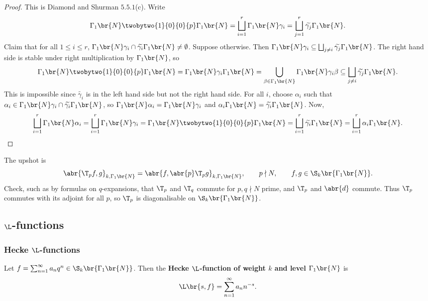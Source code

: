 \begin{proof}
This is Diamond and Shurman $ 5.5.1 $(c). Write
$$ \Gamma_1\br{N}\twobytwo{1}{0}{0}{p}\Gamma_1\br{N} = \bigsqcup_{i = 1}^r \Gamma_1\br{N}\gamma_i = \bigsqcup_{j = 1}^r \widetilde{\gamma_j}\Gamma_1\br{N}. $$
Claim that for all $ 1 \le i \le r $, $ \Gamma_1\br{N}\gamma_i \cap \widetilde{\gamma_i}\Gamma_1\br{N} \ne \emptyset $. Suppose otherwise. Then $ \Gamma_1\br{N}\gamma_i \subseteq \bigsqcup_{j \ne i} \widetilde{\gamma_j}\Gamma_1\br{N} $. The right hand side is stable under right multiplication by $ \Gamma_1\br{N} $, so
$$ \Gamma_1\br{N}\twobytwo{1}{0}{0}{p}\Gamma_1\br{N} = \Gamma_1\br{N}\gamma_i\Gamma_1\br{N} = \bigcup_{\beta \in \Gamma_1\br{N}} \Gamma_1\br{N}\gamma_i\beta \subseteq \bigsqcup_{j \ne i} \widetilde{\gamma_j}\Gamma_1\br{N}. $$
This is impossible since $ \widetilde{\gamma_i} $ is in the left hand side but not the right hand side. For all $ i $, choose $ \alpha_i $ such that $ \alpha_i \in \Gamma_1\br{N}\gamma_i \cap \widetilde{\gamma_i}\Gamma_1\br{N} $, so $ \Gamma_1\br{N}\alpha_i = \Gamma_1\br{N}\gamma_i $ and $ \alpha_i\Gamma_1\br{N} = \widetilde{\gamma_i}\Gamma_1\br{N} $. Now,
$$ \bigsqcup_{i = 1}^r \Gamma_1\br{N}\alpha_i = \bigsqcup_{i = 1}^r \Gamma_1\br{N}\gamma_i = \Gamma_1\br{N}\twobytwo{1}{0}{0}{p}\Gamma_1\br{N} = \bigsqcup_{i = 1}^r \widetilde{\gamma_i}\Gamma_1\br{N} = \bigsqcup_{i = 1}^r \alpha_i\Gamma_1\br{N}. $$
\end{proof}

The upshot is
$$ \abr{\T_pf, g}_{k, \Gamma_1\br{N}} = \abr{f, \abr{p}\T_pg}_{k, \Gamma_1\br{N}}, \qquad p \nmid N, \qquad f, g \in \S_k\br{\Gamma_1\br{N}}. $$
Check, such as by formulas on $ q $-expansions, that $ \T_p $ and $ \T_q $ commute for $ p, q \nmid N $ prime, and $ \T_p $ and $ \abr{d} $ commute. Thus $ \T_p $ commutes with its adjoint for all $ p $, so $ \T_p $ is diagonalisable on $ \S_k\br{\Gamma_1\br{N}} $.

\pagebreak

\subsection{\texorpdfstring{$ \L $}{L}-functions}

\subsubsection{Hecke \texorpdfstring{$ \L $}{L}-functions}

\begin{definition}
Let $ f = \sum_{n = 1}^\infty a_nq^n \in \S_k\br{\Gamma_1\br{N}} $. Then the \textbf{Hecke $ \L $-function of weight $ k $ and level $ \Gamma_1\br{N} $} is
$$ \L\br{s, f} = \sum_{n = 1}^\infty a_nn^{-s}. $$
\end{definition}


